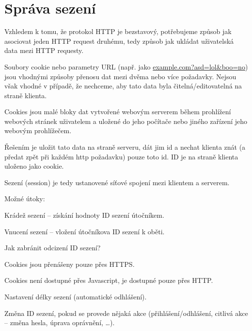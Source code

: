 
\section{Správa sezení}

\begin{compactitem}
    \item Vzhledem k tomu, že protokol HTTP je bezstavový, potřebujeme způsob jak asociovat jeden HTTP request druhému, tedy způsob jak ukládat uživatelská data mezi HTTP requesty.

    \item Soubory cookie nebo parametry URL (např. jako \url{example.com?asd=lol&boo=no}) jsou vhodnými způsoby přenosu dat mezi dvěma nebo více požadavky. Nejsou však vhodné v případě, že nechceme, aby tato data byla čitelná/editovatelná na straně klienta. \begin{compactitem}
        \item Cookies jsou malé bloky dat vytvořené webovým serverem během prohlížení webových stránek uživatelem a uložené do jeho počítače nebo jiného zařízení jeho webovým prohlížečem.
    \end{compactitem}

    \item Řešením je uložit tato data na straně serveru, dát jim id a nechat klienta znát (a předat zpět při každém http požadavku) pouze toto id. ID je na straně klienta uloženo jako cookie.

    \item Sezení (session) je tedy ustanovené síťové spojení mezi klientem a serverem.

    \item Možné útoky: \begin{compactitem}
        \item Krádež sezení -- získání hodnoty ID sezení útočníkem.
        \item Vnucení sezení -- vložení útočníkova ID sezení k oběti.
    \end{compactitem}

    \item Jak zabránit odcizení ID sezení? \begin{compactitem}
        \item Cookies jsou přenášeny pouze přes HTTPS.
        \item Cookies není dostupné přes Javascript, je dostupné pouze přes HTTP.
        \item Nastavení délky sezení (automatické odhlášení).
        \item Změna ID sezení, pokud se provede nějaká akce (přihlášení/odhlášení, citlivá akce -- změna hesla, úprava oprávnění, \ldots).
    \end{compactitem}

\end{compactitem}

